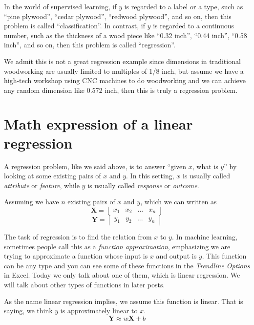 \documentclass[
	letterpaper
]{article}
\begin{document}
In the world of supervised learning, if $y$ is regarded to a label or a type, such as ``pine plywood'', ``cedar plywood'', ``redwood plywood'', and so on, then this problem is called ``classification''.
In contrast, if $y$ is regarded to a continuous number, such as the thickness of a wood piece like ``0.32 inch'', ``0.44 inch'', ``0.58 inch'', and so on, then this problem is called ``regression''. 

We admit this is not a great regression example since dimensions in traditional woodworking are usually limited to multiples of 1/8 inch, but assume we have a high-tech workshop using CNC machines to do woodworking and we can achieve any random dimension like 0.572 inch, then this is truly a regression problem.
\section{Math expression of a linear regression}
A regression problem, like we said above, is to answer ``given $x$, what is $y$'' by looking at some existing pairs of $x$ and $y$.
In this setting, $x$ is usually called \textit{attribute} or \textit{feature}, while $y$ is usually called \textit{response} or \textit{outcome}.

Assuming we have $n$ existing pairs of $x$ and $y$, which we can written as 
\begin{equation}
\mathbf{X} = \begin{bmatrix}
x_1 & x_2 & ... & x_n
\end{bmatrix}
\end{equation}
\begin{equation}
\mathbf{Y} = \begin{bmatrix}
y_1 & y_2 & ... & y_n
\end{bmatrix}
\end{equation}

The task of regression is to find the relation from $x$ to $y$.
In machine learning, sometimes people call this as a \textit{function approximation}, emphasizing we are trying to approximate a function whose input is $x$ and output is $y$.
This function can be any type and you can see some of these functions in the \textit{Trendline Options} in Excel.
Today we only talk about one of them, which is linear regression.
We will talk about other types of functions in later posts.

As the name linear regression implies, we assume this function is linear.
That is saying, we think $y$ is approximately linear to $x$.
\begin{equation}
\mathbf{Y} \approx w\mathbf{X}+b
\end{equation}
\end{document}
